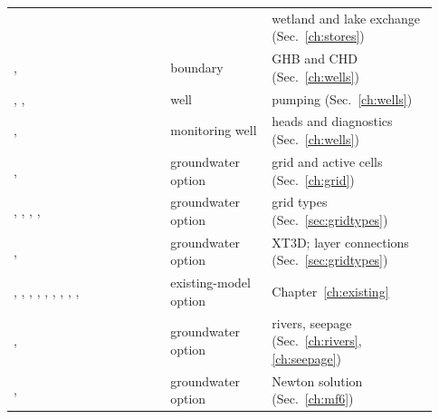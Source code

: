 \begin{longtable}{P{0.348\linewidth}P{0.22\linewidth}P{0.36\linewidth}}
 &  & wetland and lake exchange (Sec.~\ref{ch:stores})\\
,  & boundary & GHB and CHD (Sec.~\ref{ch:wells})\\
, ,  & well & pumping (Sec.~\ref{ch:wells})\\
,  & monitoring well & heads and diagnostics (Sec.~\ref{ch:wells})\\
,  & groundwater option & grid and active cells (Sec.~\ref{ch:grid})\\
, , , ,  & groundwater option & grid types (Sec.~\ref{sec:gridtypes})\\
,  & groundwater option & XT3D; layer connections (Sec.~\ref{sec:gridtypes})\\
, , , , , , , , ,  & existing-model option & Chapter~\ref{ch:existing}\\
,  & groundwater option & rivers, seepage (Sec.~\ref{ch:rivers}, \ref{ch:seepage})\\
,  & groundwater option & Newton solution (Sec.~\ref{ch:mf6})\\\bottomrule
\end{longtable}

